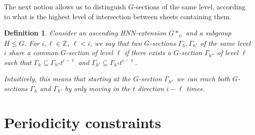 \documentclass[cupthm,crop,info]{CUP-JNL-ETS}%
\theoremstyle{cupplain}
\theoremstyle{cupdefinition}
\newtheorem{definition}{Definition}[section]
\theoremstyle{cupremark}
\theoremstyle{cupproof}
\numberwithin{equation}{section}
\begin{document}
The next notion allows us to distinguish $G$-sections of the same level, according to what is the highest level of intersection between sheets containing them.

\begin{definition} Consider an ascending HNN-extension $G*_{\psi}$ and a subgroup $H\leqslant G$. For $i,\ell\in \mathbb{Z}$, $\ell < i$, we say that two $G$-sections $\Gamma_h, \Gamma_{h'}$ of the same level $i$ \textit{share a common $G$-section of level $\ell$} if there exists a $G$-section $\Gamma_{h''}$ of level $\ell$ such that $\Gamma_{h}\subseteq \Gamma_{h''}t^{i-\ell}$ and $\Gamma_{h'}\subseteq \Gamma_{h''}t^{i-\ell}$.
	
	Intuitively, this means that starting at the $G$-section $\Gamma_{h''}$ we can reach both $G$-sections $\Gamma_{h}$ and $\Gamma_{h'}$ by only moving in the $t$ direction $i-\ell$ times.
\end{definition}



\section{Periodicity constraints}\label{section:weak_periodicity}
\end{document}
